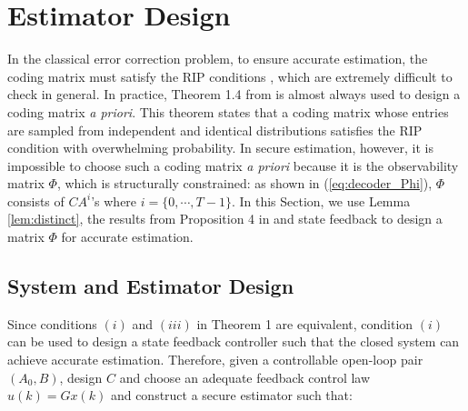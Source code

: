 \documentclass[../../thesis.tex]{subfiles}
\begin{document}
\section{Estimator Design}\label{sec:design}

In the classical error correction problem, to ensure accurate estimation, the coding matrix must satisfy the RIP conditions  \cite{tao11}, which are extremely difficult to check in general. In practice, Theorem 1.4 from\cite{tao11} is almost always used to design a coding matrix {\it a priori}. This theorem states that a coding matrix whose entries are sampled from independent and identical distributions satisfies the RIP condition with overwhelming probability. 
In secure estimation, however, it is impossible to choose such a coding matrix {\it a priori} because it is the observability matrix $\Phi$, which is structurally constrained: as shown in (\ref{eq:decoder_Phi}), $\Phi$ consists of $CA^{i}$'s where $i=\{0, \cdots, T-1\}$. In this Section, we use Lemma \ref{lem:distinct}, the results from Proposition 4 in \cite{Fawzi:2014} and state feedback to design a matrix $\Phi$ for accurate estimation. 




\subsection{System and Estimator Design}\label{sec:decoder_design}

Since conditions $(i)$ and $(iii)$ in Theorem 1 are equivalent, condition $(i)$ can be used to design a state feedback controller such that the closed system can achieve accurate estimation. Therefore, given a controllable open-loop pair $(A_0,B)$, design $C$ and choose an adequate feedback control law $u(k) = G x(k)$ and construct a secure estimator such that:
\end{document}
